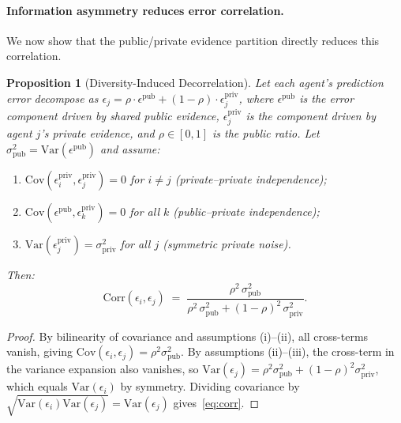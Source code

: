\documentclass[11pt]{article}
\theoremstyle{plain}
\newtheorem{proposition}{Proposition}[section]
\theoremstyle{definition}
\begin{document}
\paragraph{Information asymmetry reduces error correlation.}
We now show that the public/private evidence partition directly reduces this correlation.

\begin{proposition}[Diversity-Induced Decorrelation]
    \label{prop:decorrelation}
    Let each agent's prediction error decompose as
    $\epsilon_j = \rho \cdot \epsilon^{\mathrm{pub}} + (1-\rho) \cdot \epsilon_j^{\mathrm{priv}}$,
    where $\epsilon^{\mathrm{pub}}$ is the error component driven by shared public evidence,
    $\epsilon_j^{\mathrm{priv}}$ is the component driven by agent $j$'s private evidence,
    and $\rho \in [0,1]$ is the public ratio.
    Let $\sigma_{\mathrm{pub}}^2 = \mathrm{Var}(\epsilon^{\mathrm{pub}})$ and assume:
    \begin{enumerate}[label=(\roman*),nosep,leftmargin=20pt,topsep=2pt,itemsep=1pt]
    \item $\mathrm{Cov}(\epsilon_i^{\mathrm{priv}}, \epsilon_j^{\mathrm{priv}}) = 0$ for $i \neq j$ \textit{(private--private independence)};
    \item $\mathrm{Cov}(\epsilon^{\mathrm{pub}}, \epsilon_k^{\mathrm{priv}}) = 0$ for all $k$ \textit{(public--private independence)};
    \item $\mathrm{Var}(\epsilon_j^{\mathrm{priv}}) = \sigma_{\mathrm{priv}}^2$ for all $j$ \textit{(symmetric private noise)}.
  \end{enumerate}
    Then:
    \begin{equation}
      \mathrm{Corr}(\epsilon_i, \epsilon_j) \;=\;
      \frac{\rho^2\,\sigma_{\mathrm{pub}}^2}
           {\rho^2\,\sigma_{\mathrm{pub}}^2 + (1{-}\rho)^2\,\sigma_{\mathrm{priv}}^2}.
      \label{eq:corr}
    \end{equation}
  \end{proposition}

\begin{proof}
  By bilinearity of covariance and assumptions (i)--(ii), all cross-terms vanish,
  giving $\mathrm{Cov}(\epsilon_i, \epsilon_j) = \rho^2\sigma_{\mathrm{pub}}^2$.
  By assumptions (ii)--(iii), the cross-term in the variance expansion also vanishes,
  so $\mathrm{Var}(\epsilon_j) = \rho^2\sigma_{\mathrm{pub}}^2 + (1{-}\rho)^2\sigma_{\mathrm{priv}}^2$,
  which equals $\mathrm{Var}(\epsilon_i)$ by symmetry.
  Dividing covariance by $\sqrt{\mathrm{Var}(\epsilon_i)\mathrm{Var}(\epsilon_j)} = \mathrm{Var}(\epsilon_j)$
  gives~\eqref{eq:corr}.
  \end{proof}
\end{document}
